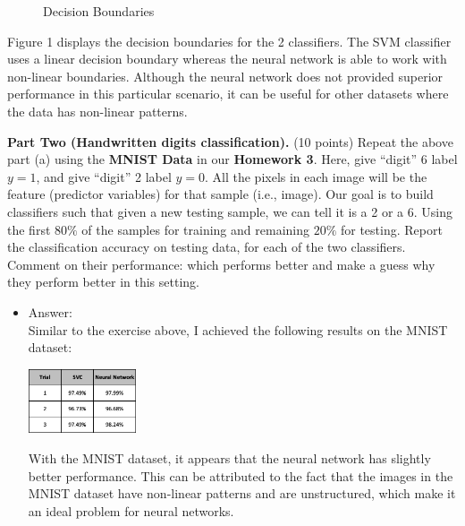 \documentclass[twoside,10pt]{article}
\begin{document}
\begin{enumerate}
\begin{enumerate}
\begin{itemize}
\begin{figure}
\caption{Decision Boundaries}
\label{fig:fig}
\end{figure}

Figure 1 displays the decision boundaries for the 2 classifiers. The SVM classifier uses a linear decision boundary whereas the neural network is able to work with non-linear boundaries. Although the neural network does not provided superior performance in this particular scenario, it can be useful for other datasets where the data has non-linear patterns.
\end{itemize}	
	
\end{enumerate}

\textbf{Part Two (Handwritten digits classification).} (10 points) Repeat the above part (a) using the \textbf{MNIST Data} in our \textbf{Homework 3}. Here, give ``digit'' 6 label $y = 1$, and give ``digit'' 2 label $y = 0$. All the pixels in each image will be the feature (predictor variables) for that sample (i.e., image). Our goal is to build classifiers such that given a new testing sample, we can tell it is a 2 or a 6. Using the first $80\%$ of the samples for training and remaining $20\%$ for testing. Report the classification accuracy on testing data, for each of the two classifiers. Comment on their performance: which performs better and make a guess why they perform better in this setting. 

\begin{itemize}
\item Answer:\\
Similar to the exercise above, I achieved the following results on the MNIST dataset:
\begin{center}
\includegraphics[width = 0.25\textwidth]{MNIST.png}
\end{center}
With the MNIST dataset, it appears that the neural network has slightly better performance. This can be attributed to the fact that the images in the MNIST dataset have non-linear patterns and are unstructured, which make it an ideal problem for neural networks.

\end{itemize}

\end{enumerate}
\end{document}
